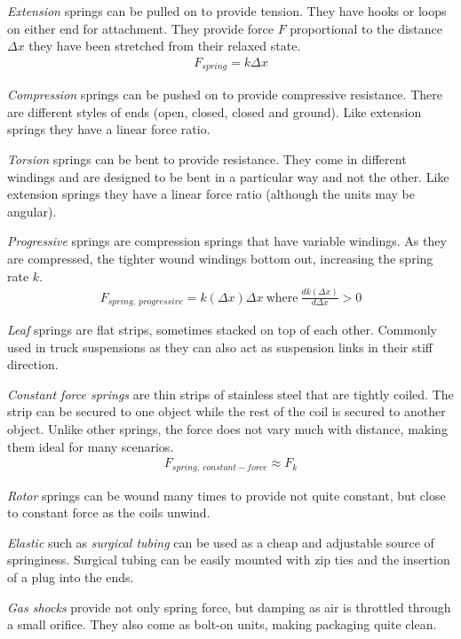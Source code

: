 	\begin{asparaenum}[a)]
		\item \textit{Extension}  springs can be pulled on to provide tension. They have hooks or loops on either end for attachment. They provide force $F$ proportional to the distance $\Delta x$ they have been stretched from their relaxed state.
		\begin{align}
			F_{spring} = k \Delta x
		\end{align}
		\item \textit{Compression}  springs can be pushed on to provide compressive resistance. There are different styles of ends (open, closed, closed and ground). Like extension springs they have a linear force ratio.
		\item \textit{Torsion}  springs can be bent to provide resistance. They come in different windings and are designed to be bent in a particular way and not the other. Like extension springs they have a linear force ratio (although the units may be angular).
		\item \textit{Progressive}  springs are compression springs that have variable windings. As they are compressed, the tighter wound windings bottom out, increasing the spring rate $k$.
		\begin{align}
			F_{spring,\ progressive} = k(\Delta x) \Delta x \ \mbox{where} \ \frac{d k(\Delta x)}{d \Delta x} > 0
		\end{align}
		\item \textit{Leaf}  springs are flat strips, sometimes stacked on top of each other. Commonly used in truck suspensions as they can also act as suspension links in their stiff direction.
		\item \textit{Constant force springs}  are thin strips of stainless steel that are tightly coiled. The strip can be secured to one object while the rest of the coil is secured to another object. Unlike other springs, the force does not vary much with distance, making them ideal for many scenarios.
		\begin{align}
			F_{spring, \ constant-force} \approx F_k
		\end{align}
		\item \textit{Rotor}  springs can be wound many times to provide not quite constant, but close to constant force as the coils unwind.		
		\item \textit{Elastic}  such as \textit{surgical tubing} can be used as a cheap and adjustable source of springiness. Surgical tubing can be easily mounted with zip ties and the insertion of a plug into the ends.
		\item \textit{Gas shocks} provide not only spring force, but damping as air is throttled through a small orifice. They also come as bolt-on units, making packaging quite clean.
	\end{asparaenum}
	
